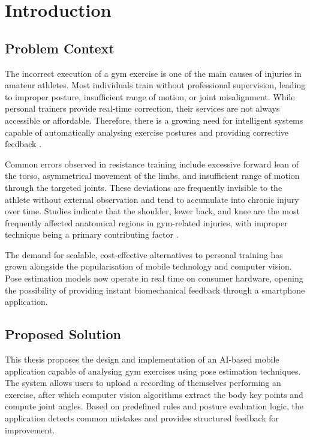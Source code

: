 \chapter{Introduction}
\label{intro}

\section{Problem Context}
\label{sec:problem}

The incorrect execution of a gym exercise is one of the main causes of injuries in amateur athletes. Most individuals train without professional supervision, leading to improper posture, insufficient range of motion, or joint misalignment. While personal trainers provide real-time correction, their services are not always accessible or affordable. Therefore, there is a growing need for intelligent systems capable of automatically analysing exercise postures and providing corrective feedback \cite{Shim2025} \cite{Sim2024}.

Common errors observed in resistance training include excessive forward lean of the torso, asymmetrical movement of the limbs, and insufficient range of motion through the targeted joints. These deviations are frequently invisible to the athlete without external observation and tend to accumulate into chronic injury over time. Studies indicate that the shoulder, lower back, and knee are the most frequently affected anatomical regions in gym-related injuries, with improper technique being a primary contributing factor \cite{Shim2025}. 

The demand for scalable, cost-effective alternatives to personal training has grown alongside the popularisation of mobile technology and computer vision. Pose estimation models now operate in real time on consumer hardware, opening the possibility of providing instant biomechanical feedback through a smartphone application.

\section{Proposed Solution}
\label{sec:solution}

This thesis proposes the design and implementation of an AI-based mobile application capable of analysing gym exercises using pose estimation techniques. The system allows users to upload a recording of themselves performing an exercise, after which computer vision algorithms extract the body key points and compute joint angles. Based on predefined rules and posture evaluation logic, the application detects common mistakes and provides structured feedback for improvement.

